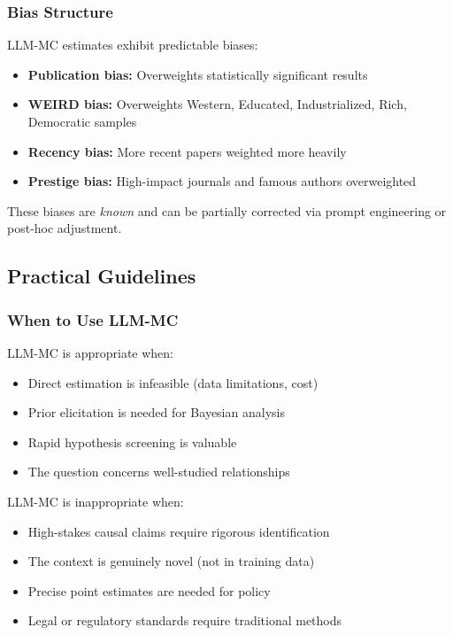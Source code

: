 \subsubsection{Bias Structure}

LLM-MC estimates exhibit predictable biases:

\begin{itemize}
    \item \textbf{Publication bias:} Overweights statistically significant results
    \item \textbf{WEIRD bias:} Overweights Western, Educated, Industrialized, Rich, Democratic samples
    \item \textbf{Recency bias:} More recent papers weighted more heavily
    \item \textbf{Prestige bias:} High-impact journals and famous authors overweighted
\end{itemize}

These biases are \textit{known} and can be partially corrected via prompt engineering or post-hoc adjustment.

\subsection{Practical Guidelines}

\subsubsection{When to Use LLM-MC}

LLM-MC is appropriate when:
\begin{itemize}
    \item Direct estimation is infeasible (data limitations, cost)
    \item Prior elicitation is needed for Bayesian analysis
    \item Rapid hypothesis screening is valuable
    \item The question concerns well-studied relationships
\end{itemize}

LLM-MC is inappropriate when:
\begin{itemize}
    \item High-stakes causal claims require rigorous identification
    \item The context is genuinely novel (not in training data)
    \item Precise point estimates are needed for policy
    \item Legal or regulatory standards require traditional methods
\end{itemize}

